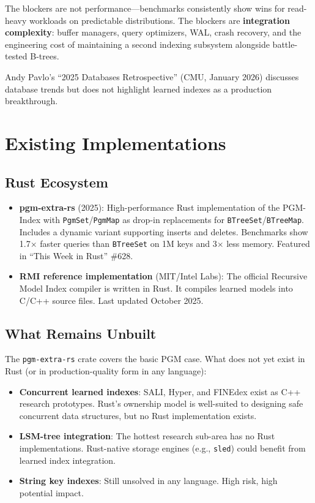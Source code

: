 \documentclass[11pt, a4paper]{article}
\begin{document}
The blockers are not performance---benchmarks consistently show wins for
read-heavy workloads on predictable distributions. The blockers are
\textbf{integration complexity}: buffer managers, query optimizers, WAL,
crash recovery, and the engineering cost of maintaining a second indexing
subsystem alongside battle-tested B-trees.

Andy Pavlo's ``2025 Databases Retrospective'' (CMU, January 2026) discusses
database trends but does not highlight learned indexes as a production
breakthrough.

\section{Existing Implementations}

\subsection{Rust Ecosystem}

\begin{itemize}[nosep]
    \item \textbf{pgm-extra-rs} (2025): High-performance Rust implementation
        of the PGM-Index with \texttt{PgmSet}/\texttt{PgmMap} as drop-in
        replacements for \texttt{BTreeSet}/\texttt{BTreeMap}. Includes a
        dynamic variant supporting inserts and deletes. Benchmarks show
        1.7$\times$ faster queries than \texttt{BTreeSet} on 1M keys and
        3$\times$ less memory. Featured in ``This Week in Rust'' \#628.
    \item \textbf{RMI reference implementation} (MIT/Intel Labs): The official
        Recursive Model Index compiler is written in Rust. It compiles
        learned models into C/C++ source files. Last updated October 2025.
\end{itemize}

\subsection{What Remains Unbuilt}

The \texttt{pgm-extra-rs} crate covers the basic PGM case. What does not
yet exist in Rust (or in production-quality form in any language):

\begin{itemize}[nosep]
    \item \textbf{Concurrent learned indexes}: SALI, Hyper, and FINEdex
        exist as C++ research prototypes. Rust's ownership model is
        well-suited to designing safe concurrent data structures, but
        no Rust implementation exists.
    \item \textbf{LSM-tree integration}: The hottest research sub-area
        has no Rust implementations. Rust-native storage engines
        (e.g., \texttt{sled}) could benefit from learned index integration.
    \item \textbf{String key indexes}: Still unsolved in any language.
        High risk, high potential impact.
\end{itemize}
\end{document}

